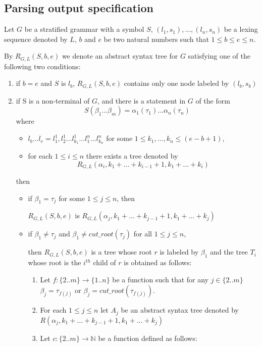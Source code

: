 \documentclass[a4paper,10pt]{article}
\begin{document}
\subsection{Parsing output specification}

Let $G$ be a stratified grammar with a symbol $S$,  $(l_1,s_1),\ldots, (l_n,s_n)$ be a lexing sequence denoted by $L$, $b$ and $e$ be two natural numbers such that $1 \le b \le e \le n$.


 By $R_{G,L}(S,b,e)$ we denote an abstract syntax tree for $G$ satisfying one of the following two conditions: 
\begin{enumerate}
\item if $b = e$ and $S$ is  $l_b$, 
 $R_{G,L}(S,b,e)$ contains only one node labeled by $(l_b, s_b)$

 
\item if S is a non-terminal of $G$, and there is a statement in $G$ of the form 
$$ S(\beta_1 \ldots \beta_m) = \alpha_1(\tau_1) \ldots  \alpha_n(\tau_n)  $$
where 
\begin{itemize}
\item $l_b \dots l_e = l^1_1,l^1_2 \ldots l^1_{k_1} \ldots l^n_1 \ldots l^n_{k_n}$ for some  $1 \le k_1,\ldots,k_n \le (e-b+1)$,
\item for each $1\le i \le n$ there exists a tree denoted by $$R_{G,L}(\alpha_i,k_1+ \ldots + k_{i-1}+1, k_1+ \ldots + k_{i})$$
\end{itemize}
then
\begin{itemize}
\item if $\beta_1 = \tau_j$ for some $ 1\le j \le n$, then

  $R_{G,L}(S,b,e)$ is $R_{G,L}(\alpha_j,k_1+ \ldots + k_{j-1}+1, k_1+ \ldots + k_{j})$  

\item if $\beta_1 \not= \tau_j$ and  $\beta_1 \not= cut\_root(\tau_j)$   for all $ 1\le j \le n$, 

  then $R_{G,L}(S,b,e)$ is a tree whose root $r$ is labeled by $\beta_1$ and the tree $T_i$ whose root is the $i^{th}$ child of $r$ is obtained as follows:
 \begin{enumerate}
 \item Let $f:\{2..m\} \to \{1..n\}$ be a function such that for any $j \in \{2..m\}$ $\beta_j = \tau_{f(j)}$ or  $\beta_j = cut\_root(\tau_{f(j)})$.
 \item For each $1\le j \le n$ let $A_j$ be an abstract syntax tree denoted by $R(\alpha_j,k_1+ \ldots + k_{j-1}+1, k_1+ \ldots + k_{j})$
 \item Let $c:\{2..m\} \to \mathbb{N}$ be a function defined as follows:


\end{enumerate}
\end{itemize}
\end{enumerate}
\end{document}
